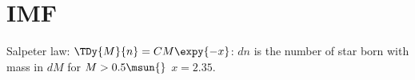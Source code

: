 \section{IMF}
Salpeter law: $\TDy{M}{n}=CM\expy{-x}$: $dn$ is the number of star born with mass in $dM$ for $M>0.5\msun{}$ $x=2.35$.

